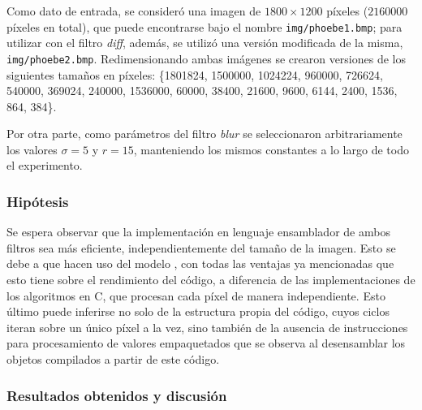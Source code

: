         	Como dato de entrada, se consideró una imagen de $1800 \times 1200$ píxeles ($2160000$ píxeles en total), que puede encontrarse bajo el nombre \texttt{img/phoebe1.bmp}; para utilizar con el filtro \emph{diff}, además, se utilizó una versión modificada de la misma, \texttt{img/phoebe2.bmp}. Redimensionando ambas imágenes se crearon versiones de los siguientes tamaños en píxeles: \{1801824, 1500000, 1024224, 960000, 726624, 540000, 369024, 240000, 1536000, 60000, 38400, 21600, 9600, 6144, 2400, 1536, 864, 384\}.

        	Por otra parte, como parámetros del filtro \emph{blur} se seleccionaron arbitrariamente los valores $\sigma = 5$ y $r = 15$, manteniendo los mismos constantes a lo largo de todo el experimento.

        \subsubsection*{Hipótesis}
            Se espera observar que la implementación en lenguaje ensamblador de ambos filtros sea más eficiente, independientemente del tamaño de la imagen. Esto se debe a que hacen uso del modelo , con todas las ventajas ya mencionadas que esto tiene sobre el rendimiento del código, a diferencia de las implementaciones de los algoritmos en C, que procesan cada píxel de manera independiente. Esto último puede inferirse no solo de la estructura propia del código, cuyos ciclos iteran sobre un único píxel a la vez, sino también de la ausencia de instrucciones  para procesamiento de valores empaquetados que se observa al desensamblar los objetos compilados a partir de este código.

        \subsubsection*{Resultados obtenidos y discusión}

